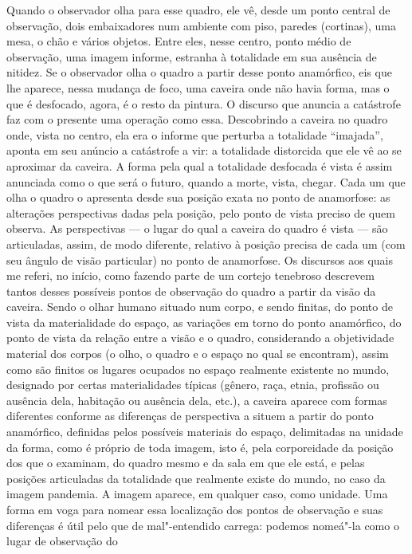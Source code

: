 Quando o observador olha para esse quadro, ele vê, desde um ponto
central de observação, dois embaixadores num ambiente com piso, paredes
(cortinas), uma mesa, o chão e vários objetos. Entre eles, nesse centro,
ponto médio de observação, uma imagem informe, estranha à totalidade em
sua ausência de nitidez. Se o observador olha o quadro a partir desse
ponto anamórfico, eis que lhe aparece, nessa mudança de foco, uma
caveira onde não havia forma, mas o que é desfocado, agora, é o resto da
pintura. O discurso que anuncia a catástrofe faz com o presente uma
operação como essa. Descobrindo a caveira no quadro onde, vista no
centro, ela era o informe que perturba a totalidade ``imajada'', aponta
em seu anúncio a catástrofe a vir: a totalidade distorcida que ele vê ao
se aproximar da caveira. A forma pela qual a totalidade desfocada é
vista é assim anunciada como o que será o futuro, quando a morte, vista,
chegar. Cada um que olha o quadro o apresenta desde sua posição exata no
ponto de anamorfose: as alterações perspectivas dadas pela posição, pelo
ponto de vista preciso de quem observa. As perspectivas --- o lugar do
qual a caveira do quadro é vista --- são articuladas, assim, de modo
diferente, relativo à posição precisa de cada um (com seu ângulo de
visão particular) no ponto de anamorfose. Os discursos aos quais me
referi, no início, como fazendo parte de um cortejo tenebroso descrevem
tantos desses possíveis pontos de observação do quadro a partir da visão
da caveira. Sendo o olhar humano situado num corpo, e sendo finitas, do
ponto de vista da materialidade do espaço, as variações em torno do
ponto anamórfico, do ponto de vista da relação entre a visão e o quadro,
considerando a objetividade material dos corpos (o olho, o quadro e o
espaço no qual se encontram), assim como são finitos os lugares ocupados
no espaço realmente existente no mundo, designado por certas
materialidades típicas (gênero, raça, etnia, profissão ou ausência dela,
habitação ou ausência dela, etc.), a caveira aparece com formas
diferentes conforme as diferenças de perspectiva a situem a partir do
ponto anamórfico, definidas pelos possíveis materiais do espaço,
delimitadas na unidade da forma, como é próprio de toda imagem, isto é,
pela corporeidade da posição dos que o examinam, do quadro mesmo e da
sala em que ele está, e pelas posições articuladas da totalidade que
realmente existe do mundo, no caso da imagem pandemia. A imagem aparece,
em qualquer caso, como unidade. Uma forma em voga para nomear essa
localização dos pontos de observação e suas diferenças é útil pelo que
de mal"-entendido carrega: podemos nomeá"-la como o lugar de observação do

